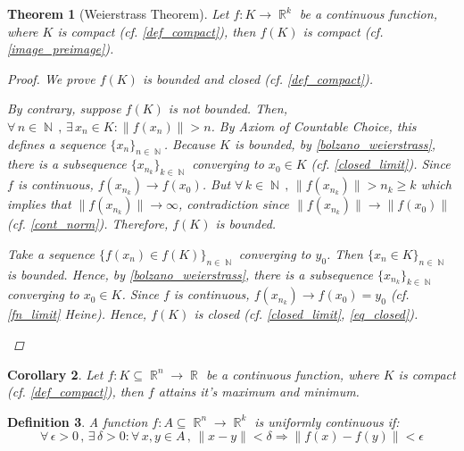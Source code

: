 \documentclass[12pt]{article}
\let\RA\Rightarrow
\let\ee\epsilon
\newcommand{\Forall}[1]{\forall\,{#1}\,,\,}
\newcommand{\Exist}[1]{\exists\,{#1}:}
\DeclareMathOperator{\R}{\mathbb{R}}
\DeclareMathOperator{\N}{\mathbb{N}}
\newcommand{\seq}[2]{\{{#1}\}_{#2\in\N}}
\newtheorem{theorem}{Theorem}[subsection]
\newtheorem{definition}[theorem]{Definition}
\newtheorem{corollary}[theorem]{Corollary}
\begin{document}
\begin{theorem}[Weierstrass Theorem]
  \label{weierstrass_thm}
  Let $f:K\to \R^k$ be a continuous function, where $K$ is compact (cf. \ref{def_compact}), then $f(K)$ is compact (cf. \ref{image_preimage}).
  \begin{proof}
    We prove $f(K)$ is bounded and closed (cf. \ref{def_compact}).
    \begin{compactitem}
      \item By contrary, suppose $f(K)$ is not bounded. Then, $\Forall{n\in\N}\Exist{x_n\in K}\|f(x_n)\|>n$. By Axiom of Countable Choice, this defines a sequence $\seq{x_n}{n}$. Because $K$ is bounded, by  \ref{bolzano_weierstrass}, there is a subsequence $\seq{x_{n_k}}{k}$ converging to $x_0\in K$ (cf. \ref{closed_limit}). Since $f$ is continuous, $f(x_{n_k})\to f(x_0)$. But $\Forall{k\in\N}\|f(x_{n_k})\|>n_{k}\geq k$ which implies that $\|f(x_{n_k})\|\to \infty$, contradiction since $\|f(x_{n_k})\|\to \|f(x_0)\|$ (cf. \ref{cont_norm}). Therefore, $f(K)$ is bounded.
      \item Take a sequence $\seq{f(x_n)\in f(K)}{n}$ converging to $y_0$. Then $\seq{x_n\in K}{n}$ is bounded. Hence, by \ref{bolzano_weierstrass}, there is a subsequence $\seq{x_{n_k}}{k}$ converging to $x_0\in K$. Since $f$ is continuous, $f(x_{n_k})\to f(x_0)=y_0$ (cf. \ref{fn_limit} Heine). Hence, $f(K)$ is closed (cf. \ref{closed_limit}, \ref{eq_closed}).
    \end{compactitem}
  \end{proof}
\end{theorem}

\begin{corollary}
  Let $f:K\subseteq \R^n\to \R$ be a continuous function, where $K$ is compact (cf. \ref{def_compact}), then $f$ attains it's maximum and minimum.
\end{corollary}

\begin{definition}
  A function $f:A\subseteq \R^n\to \R^k$ is uniformly continuous if: $$\Forall{\ee>0}\Exist{\delta>0}\Forall{x,y\in A}\|x-y\|<\delta\RA \|f(x)-f(y)\|<\ee$$
\end{definition}
\end{document}
